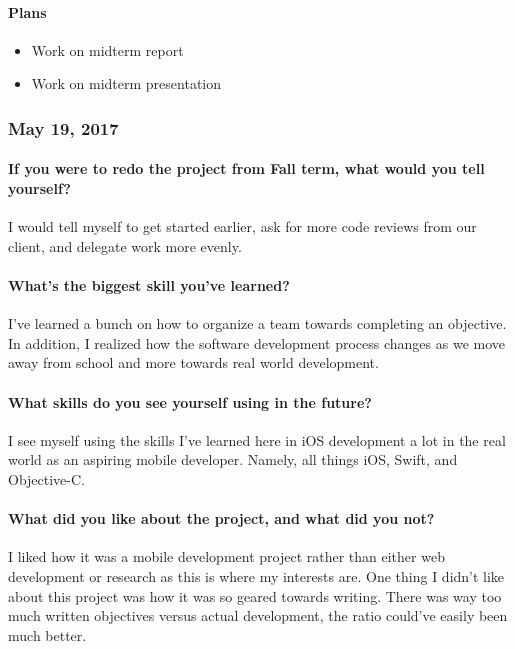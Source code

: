 \paragraph{Plans}\label{plans}
\begin{itemize}
\tightlist
\item
  Work on midterm report
\item
  Work on midterm presentation
\end{itemize}

\subsubsection{May 19, 2017}\label{section}
\paragraph{If you were to redo the project from Fall term, what would
you tell
yourself?}\label{if-you-were-to-redo-the-project-from-fall-term-what-would-you-tell-yourself}
I would tell myself to get started earlier, ask for more code reviews
from our client, and delegate work more evenly.
\paragraph{What's the biggest skill you've
learned?}\label{whats-the-biggest-skill-youve-learned}
I've learned a bunch on how to organize a team towards completing an
objective. In addition, I realized how the software development process
changes as we move away from school and more towards real world
development.
\paragraph{What skills do you see yourself using in the
future?}\label{what-skills-do-you-see-yourself-using-in-the-future}
I see myself using the skills I've learned here in iOS development a lot
in the real world as an aspiring mobile developer. Namely, all things
iOS, Swift, and Objective-C.
\paragraph{What did you like about the project, and what did you
not?}\label{what-did-you-like-about-the-project-and-what-did-you-not}
I liked how it was a mobile development project rather than either web
development or research as this is where my interests are. One thing I
didn't like about this project was how it was so geared towards writing.
There was way too much written objectives versus actual development, the
ratio could've easily been much better.
